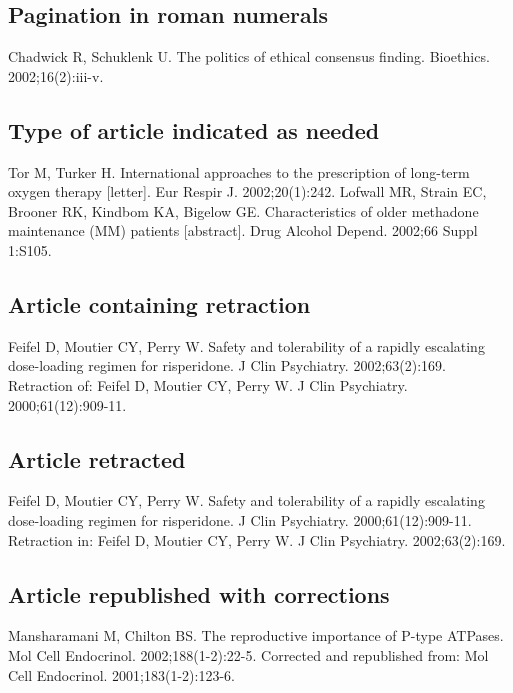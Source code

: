 \documentclass[a4paper,10pt]{article}
\begin{document}
\subsection{Pagination in roman numerals}

Chadwick R, Schuklenk U. The politics of ethical consensus finding. Bioethics. 2002;16(2):iii-v.\cite{chadwick.schuklenk:politics}

\subsection{Type of article indicated as needed}

Tor M, Turker H. International approaches to the prescription of long-term oxygen therapy [letter]. Eur Respir J. 2002;20(1):242.\cite{tor.turker:international}
\linebreak 
Lofwall MR, Strain EC, Brooner RK, Kindbom KA, Bigelow GE. Characteristics of older methadone maintenance (MM) patients [abstract]. Drug Alcohol Depend. 2002;66 Suppl 1:S105.\cite{lofwall.strain.ea:characteristics}

\subsection{Article containing retraction}

Feifel D, Moutier CY, Perry W. Safety and tolerability of a rapidly escalating dose-loading regimen for risperidone. J Clin Psychiatry. 2002;63(2):169. Retraction of: Feifel D, Moutier CY, Perry W. J Clin Psychiatry. 2000;61(12):909-11.\cite{feifel.moutier.ea:safety}

\subsection{Article retracted}

Feifel D, Moutier CY, Perry W. Safety and tolerability of a rapidly escalating dose-loading regimen for risperidone. J Clin Psychiatry. 2000;61(12):909-11. Retraction in: Feifel D, Moutier CY, Perry W. J Clin Psychiatry. 2002;63(2):169.\cite{feifel.moutier.ea:safety*1}

\subsection{Article republished with corrections}

Mansharamani M, Chilton BS. The reproductive importance of P-type ATPases. Mol Cell Endocrinol. 2002;188(1-2):22-5. Corrected and republished from: Mol Cell Endocrinol. 2001;183(1-2):123-6.\cite{mansharamani.chilton:reproductive}
\end{document}
